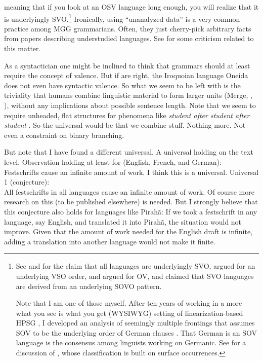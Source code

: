 \documentclass[output=paper,colorlinks,citecolor=brown]{langscibook}
\begin{document}
meaning that if you look at an OSV language long enough, you will realize that it is underlyingly SVO.\footnote{
See \citet[]{Chomsky65a} and \citet{Kayne94a-u} for the claim that all languages are
underlyingly SVO,
\citet{McCawley70a-u} argued for an underlying VSO order, \citet[]{Bach71a-u} and \citet{Ross73a-u} argued for OV, and
\citet{Haider2000a,Haider2010a,Haider2020a} claimed that SVO languages are derived from an
underlying SOVO pattern.

Note that I am one of those myself. After ten years of working in a more what you see is what you
get (WYSIWYG) setting of linearization-based HPSG \citep{Mueller2004b}, I developed an analysis of seemingly multiple frontings that assumes SOV
to be the underlying order of German clauses \parencites{Mueller2005c,Mueller2005d,MuellerGS}. That
German is an SOV language is the consensus among linguists working on Germanic. See
\citet{MuellerGermanic} for a discussion of \citet{Dryer2013c}, whose classification is built on
surface occurrences.
}
Ironically, using ``unanalyzed data'' is a very common practice among MGG
grammarians. Often, they just cherry-pick arbitrary facts from papers describing understudied
languages. See \citet{Fanselow2004b} for some criticism related to this matter.
 
As a syntactician one might be inclined to think that grammars should at least require the concept of valence. But
if \citet{KM2012a} are right, the Iroquoian language Oneida does not even have syntactic valence. So
what we seem to be left with is the triviality that humans combine linguistic material to form
larger units (Merge, \citealp{HCF2002a}, \citealp[]{MuellerCoreGram}), without any implications about possible sentence length. Note that we seem to
require unheaded, flat structures for phenomena like \emph{student after student after student} \parencites{Matsuyama2004a}{Jackendoff2008a}{Bargmann2015a}[Section~4.1]{MuellerCxG}. So
the universal would be that we combine stuff. Nothing more. Not even a constraint on binary branching.

But note that I have found a different universal. A universal holding on the text level. 
\ea
Observation holding at least for (English, French, and German):\\
Festschrifts cause an infinite amount of work.
\z
I think this is a universal.
\ea
Universal 1 (conjecture):\\
All festschrifts in all languages cause an infinite amount of work.
\z
Of course more research on this (to be published elsewhere) is needed. But I strongly believe that
this conjecture also holds for languages like Pirahã: If we took a festschrift in
any language, say English, and translated it into Pirahã, the situation would not improve. Given that
the amount of work needed for the English draft is infinite, adding a translation into another
language would not make it finite. 
\end{document}

